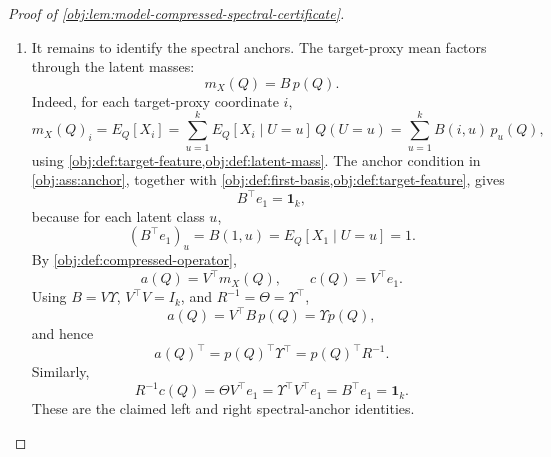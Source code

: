 \begin{proof}[Proof of \cref{obj:lem:model-compressed-spectral-certificate}]
\begin{enumerate}
\item
It remains to identify the spectral anchors.  The target-proxy mean factors through the latent masses:
\[
m_X(Q)=B\,p(Q).
\]
Indeed, for each target-proxy coordinate \(i\),
\[
m_X(Q)_i
=
E_Q[X_i]
=
\sum_{u=1}^k E_Q[X_i\mid U=u]\,Q(U=u)
=
\sum_{u=1}^k B(i,u)\,p_u(Q),
\]
using \cref{obj:def:target-feature,obj:def:latent-mass}.  The anchor condition in \cref{obj:ass:anchor}, together with \cref{obj:def:first-basis,obj:def:target-feature}, gives
\[
B^\top e_1=\mathbf 1_k,
\]
because for each latent class \(u\),
\[
(B^\top e_1)_u=B(1,u)=E_Q[X_1\mid U=u]=1 .
\]
By \cref{obj:def:compressed-operator},
\[
a(Q)=V^\top m_X(Q),
\qquad
c(Q)=V^\top e_1 .
\]
Using \(B=V\Upsilon\), \(V^\top V=I_k\), and \(R^{-1}=\Theta=\Upsilon^\top\),
\[
a(Q)=V^\top B\,p(Q)=\Upsilon p(Q),
\]
and hence
\[
a(Q)^\top=p(Q)^\top\Upsilon^\top=p(Q)^\top R^{-1}.
\]
Similarly,
\[
R^{-1}c(Q)
=
\Theta V^\top e_1
=
\Upsilon^\top V^\top e_1
=
B^\top e_1
=
\mathbf 1_k .
\]
These are the claimed left and right spectral-anchor identities.
\end{enumerate}
\end{proof}
